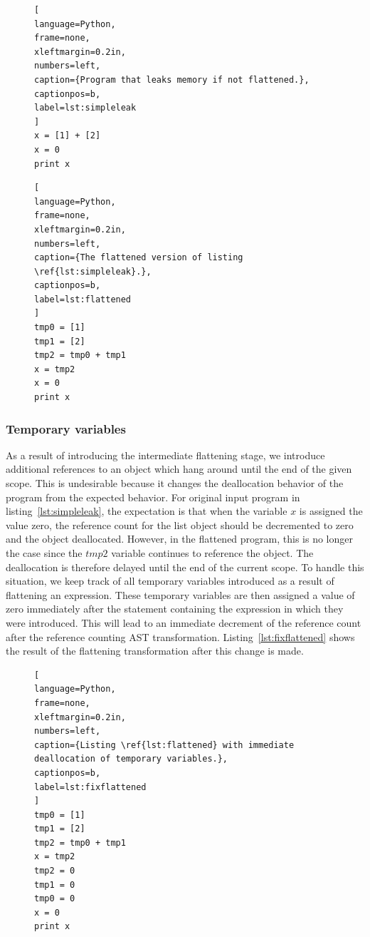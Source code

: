 \documentclass{sigplanconf}
\newcommand{\avariable}[1]{\ensuremath{#1}}
\begin{document}
\begin{figure}[h]
\begin{lstlisting}[
language=Python,
frame=none,
xleftmargin=0.2in,
numbers=left,
caption={Program that leaks memory if not flattened.},
captionpos=b,
label=lst:simpleleak
]
x = [1] + [2]
x = 0
print x
\end{lstlisting}
\end{figure}

\begin{figure}[h]
\begin{lstlisting}[
language=Python,
frame=none,
xleftmargin=0.2in,
numbers=left,
caption={The flattened version of listing \ref{lst:simpleleak}.},
captionpos=b,
label=lst:flattened
]
tmp0 = [1]
tmp1 = [2]
tmp2 = tmp0 + tmp1
x = tmp2
x = 0
print x
\end{lstlisting}
\end{figure}

\subsubsection{Temporary variables}
As a result of introducing the intermediate flattening stage, we introduce additional references to an object which hang around until the end of the given scope.  This is undesirable because it changes the deallocation behavior of the program from the expected behavior.  For original input program in listing~\ref{lst:simpleleak}, the expectation is that when the variable \avariable{x} is assigned the value zero, the reference count for the list object should be decremented to zero and the object deallocated.  However, in the flattened program, this is no longer the case since the \avariable{tmp2} variable continues to reference the object.  The deallocation is therefore delayed until the end of the current scope.  To handle this situation, we keep track of all temporary variables introduced as a result of flattening an expression.  These temporary variables are then assigned a value of zero immediately after the statement containing the expression in which they were introduced.  This will lead to an immediate decrement of the reference count after the reference counting AST transformation.  Listing~\ref{lst:fixflattened} shows the result of the flattening transformation after this change is made.

\begin{figure}[h]
\begin{lstlisting}[
language=Python,
frame=none,
xleftmargin=0.2in,
numbers=left,
caption={Listing \ref{lst:flattened} with immediate deallocation of temporary variables.},
captionpos=b,
label=lst:fixflattened
]
tmp0 = [1]
tmp1 = [2]
tmp2 = tmp0 + tmp1
x = tmp2
tmp2 = 0
tmp1 = 0
tmp0 = 0
x = 0
print x
\end{lstlisting}
\end{figure}
\end{document}
